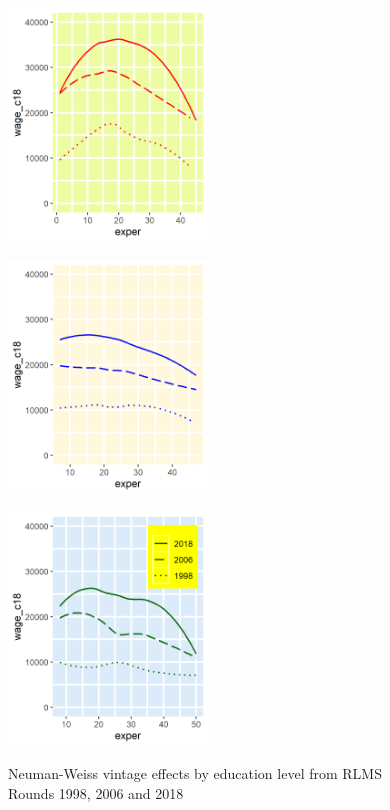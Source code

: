\documentclass[12pt,a4paper]{article}
\numberwithin{equation}{section}
\begin{document}
{\begin{figure}[H]
  \begin{minipage}[b]{.3\linewidth}
     \centering
     \hspace*{-0.7in}
     \includegraphics[width=150pt]{dp01_he.png}
     \label{fig:4a}
  \end{minipage}
  \hfill
  \begin{minipage}[b]{.3\linewidth}
     \centering
     \hspace*{-0.7in}
     \includegraphics[width=150pt]{dp01_ve.png}
     \label{fig:4b}
  \end{minipage}
\hfill
  \begin{minipage}[b]{.3\linewidth}
     \centering
     \hspace*{-0.7in}
     \includegraphics[width=150pt]{dp01_se.png}
     \label{fig:4c}
  \end{minipage}
  \caption{Neuman-Weiss vintage effects by education level from RLMS Rounds 1998, 2006 and 2018}\label{fig:4}
\end{figure}


}
\end{document}
